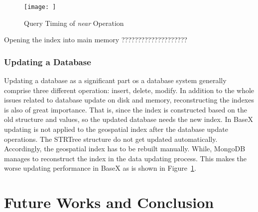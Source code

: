 \documentclass[a4paper,12pt]{article}
\begin{document}
\begin{figure}
\centering
\texttt{[image: ]}
\caption{Query Timing of \textit{near} Operation}
\label{figBXvsMongoNear}
\end{figure}


Opening the index into main memory ????????????????????


\subsubsection{Updating a Database}

Updating a database as a significant part os a database system generally comprise three different operation: insert, delete, modify. In addition to the whole issues related to database update on disk and memory, reconstructing the indexes is also of great importance. That is, since the index is constructed based on the old structure and values, so the updated database needs the new index. In BaseX updating is not applied to the geospatial index after the database update operations. The STRTree structure do not get updated automatically. Accordingly, the geospatial index has to be rebuilt manually. While, MongoDB manages to reconstruct the index in the data updating process. This makes the worse updating performance in BaseX as is shown in Figure~\ref{}.





\newpage
\section{Future Works and Conclusion}
\newpage


\end{document}
